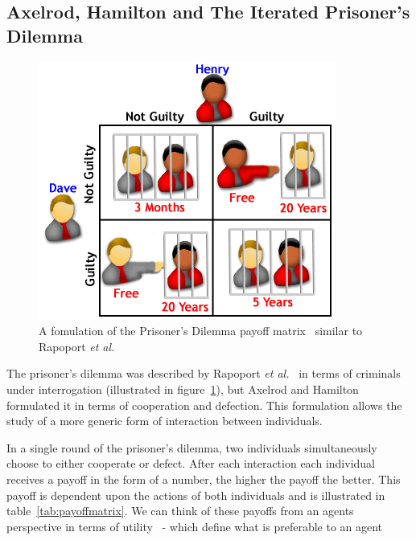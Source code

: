 \documentclass[]{final_report}
\begin{document}
\subsection{Axelrod, Hamilton and The Iterated Prisoner's Dilemma}
\label{sec:ipd}
\begin{figure}
\vspace{-20pt}
\begin{framed}
	\center
	\includegraphics[width=\textwidth]{LaymansIPD.png}
	\caption{A fomulation of the Prisoner's Dilemma payoff matrix~\cite{laymansipd} similar to Rapoport \textit{et al.}~\cite{rapoport1965prisoner}}
	\label{fig:ipdvis}
\end{framed}
\vspace{-20pt}
\end{figure}
The prisoner's dilemma was described by Rapoport \textit{et al.}~\cite{rapoport1965prisoner} in terms of criminals under interrogation (illustrated in figure~\ref{fig:ipdvis}), but Axelrod and Hamilton~\cite{evolution_of_cooperation} formulated it in terms of cooperation and defection. This formulation allows the study of a more generic form of interaction between individuals.\par 
In a single round of the prisoner's dilemma, two individuals simultaneously choose to either cooperate or defect. After each interaction each individual receives a payoff in the form of a number, the higher the payoff the better. This payoff is dependent upon the actions of both individuals and is illustrated in table~\ref{tab:payoffmatrix}. We can think of these payoffs from an agents perspective in terms of utility~\cite{wooldridge2009introduction} - which define what is preferable to an agent\par
\end{document}
